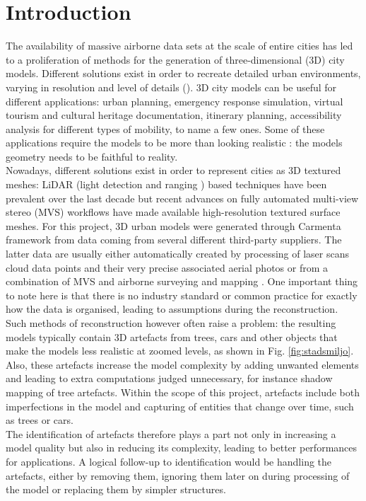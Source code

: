 \documentclass{kththesis}
\begin{document}
\chapter{Introduction}
The availability of massive airborne data sets at the scale of entire
cities has led to a proliferation of methods for the generation of three-dimensional (3D) city models. Different solutions exist in order to recreate detailed urban environments, varying in resolution and level of details (\parencite{UrbanReconstructionSurvey}). 3D city models can be useful for different applications: urban planning, emergency response simulation,
virtual tourism and cultural heritage documentation, itinerary planning,
accessibility analysis for different types of mobility, to name a few ones. Some of these applications require the models to be more than looking realistic : the models geometry needs to be faithful to reality. \\
Nowadays, different solutions exist in order to represent cities as 3D textured meshes: LiDAR (light detection and ranging \parencite{lidarpage}) based techniques have been prevalent over the last decade but recent advances on fully automated multi-view stereo (MVS) workflows have made available high-resolution textured surface meshes. For this project,  3D urban models were generated through Carmenta framework from data coming from several different third-party suppliers. The latter data are usually either automatically created by processing of laser scans cloud data points and their very precise associated aerial photos or from a combination of MVS and airborne surveying and mapping \parencite{acute3D}.  One important thing to note here is that there is no industry standard or common practice for exactly how the data is organised, leading to assumptions during the reconstruction. %
\\ Such methods of reconstruction however often raise a problem: the resulting models typically contain 3D artefacts from trees, cars and other objects that make the models less realistic at zoomed levels, as shown in Fig. \ref{fig:stadsmiljo}. Also, these artefacts increase the model complexity by adding unwanted elements and leading  to extra computations judged unnecessary, for instance shadow mapping of tree artefacts. Within the scope of this project, artefacts include both imperfections in the model and capturing of entities that change over time, such as trees or cars. \\
The identification of artefacts therefore plays a part not only in increasing a model quality but also in reducing its complexity, leading to better performances for applications. A logical follow-up to identification would be handling the artefacts, either by removing them, ignoring them later on during processing of the model or replacing them by simpler structures. \\
\end{document}
